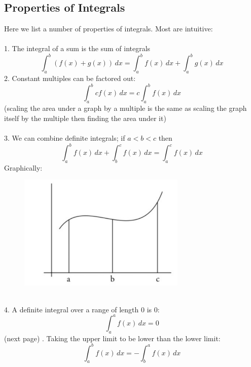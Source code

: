 \documentclass{report}
\begin{document}
\subsection{Properties of Integrals} %
Here we list a number of properties of integrals. Most are intuitive:\\
\vspace{1mm}\\
1. The integral of a sum is the sum of integrals
\begin{equation*}
\int_a^b(f(x)+g(x))\,dx=\int_a^bf(x)\,dx+\int_a^bg(x)\,dx
\end{equation*}
2. Constant multiples can be factored out:
\begin{equation*}
\int_a^bcf(x)\,dx=c\int_a^bf(x)\,dx
\end{equation*}
(scaling the area under a graph by a multiple is the same as scaling the graph
itself by the multiple then finding the area under it)\\
\vspace{1mm}\\
3. We can combine definite integrals; if $a<b<c$ then
\begin{equation*}
\int_a^bf(x)\,dx+\int_b^cf(x)\,dx=\int_a^cf(x)\,dx
\end{equation*}
Graphically:
\begin{figure}[h]
\includegraphics[width=8cm]{Capture30}\\
\centering
{}
\end{figure}\\
4. A definite integral over a range of length 0 is 0:
\begin{equation*}
\int_a^af(x)\,dx=0
\end{equation*}
(next page)
\newpage
{}. Taking the upper limit to be lower than the lower limit:
\begin{equation*}
\int_a^bf(x)\,dx=-\int_b^af(x)\,dx
\end{equation*}
\end{document}
